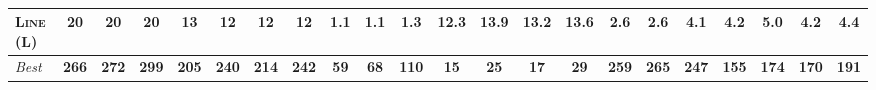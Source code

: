 \documentclass[11pt,landscape]{article}
\begin{document}
\begin{table*}[tb]
{\begin{tabular}{|l||ccccccc||ccccccc||ccccccc||}
\textsc{Line} (L)&\textbf{20}&\textbf{20}&\textbf{20}&13&12&12&12&\textbf{1.1}&\textbf{1.1}&1.3&12.3&13.9&13.2&13.6&\textbf{2.6}&\textbf{2.6}&4.1&4.2&5.0&4.2&4.4
\\\hline
\textit{Best}&\textbf{266}&\textbf{272}&\textbf{299}&\textbf{205}&\textbf{240}&\textbf{214}&\textbf{242}&\textbf{59}&\textbf{68}&\textbf{110}&\textbf{15}&\textbf{25}&\textbf{17}&\textbf{29}&\textbf{259}&\textbf{265}&\textbf{247}&\textbf{155}&\textbf{174}&\textbf{170}&\textbf{191}\\\hline

        \end{tabular}}
        \caption{}
        \label{tab:all-patty}
        \end{table*}
        
\end{document}
